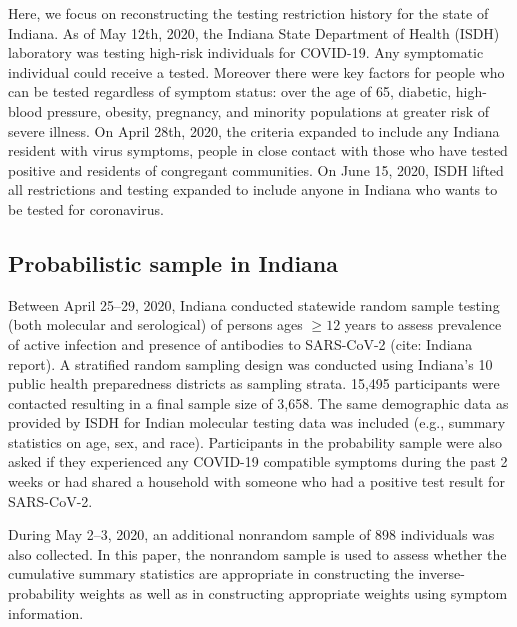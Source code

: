 \documentclass[11pt]{amsart}
\begin{document}
Here, we focus on reconstructing the testing restriction history for the state of Indiana. As of May 12th, 2020, the Indiana State Department of Health (ISDH) laboratory was testing high-risk individuals for COVID-19. Any symptomatic individual could receive a tested.  Moreover there were key factors for people who can be tested regardless of symptom status: over the age of 65, diabetic, high-blood pressure, obesity, pregnancy, and minority populations at greater risk of severe illness.
On April 28th, 2020, the criteria expanded to include any Indiana resident with virus symptoms, people in close contact with those who have tested positive and residents of congregant communities.
On June 15, 2020, ISDH lifted all restrictions and testing expanded to include anyone in Indiana who wants to be tested for coronavirus.

\subsection{Probabilistic sample in Indiana}

Between April 25--29, 2020, Indiana conducted statewide random sample testing (both molecular and serological) of persons ages $\geq 12$ years to assess prevalence of active infection and presence of antibodies to SARS-CoV-2 (cite: Indiana report). A stratified random sampling design was conducted using Indiana’s 10 public health preparedness districts as sampling strata. 15,495 participants were contacted resulting in a final sample size of 3,658. The same demographic data as provided by ISDH for Indian molecular testing data was included (e.g., summary statistics on age, sex, and race). Participants in the probability sample were also asked if they experienced any COVID-19 compatible symptoms during the past 2 weeks or had shared a household with someone who had a positive test result for SARS-CoV-2.

During May 2--3, 2020, an additional nonrandom sample of 898 individuals was also collected.  In this paper, the nonrandom sample is used to assess whether the cumulative summary statistics are appropriate in constructing the inverse-probability weights as well as in constructing appropriate weights using symptom information.
\end{document}

